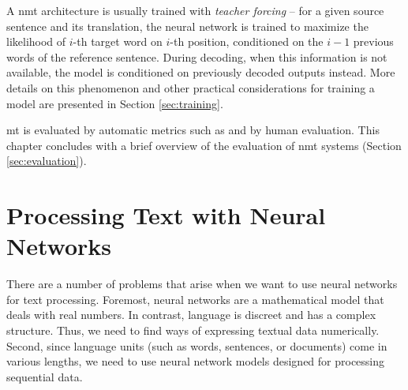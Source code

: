 A \gls{nmt} architecture is usually trained with \emph{teacher forcing} -- for
a given source sentence and its translation, the neural network is trained to
maximize the likelihood of $i$-th target word on $i$-th position, conditioned
on the $i-1$ previous words of the reference sentence. During decoding, when
this information is not available, the model is conditioned on previously
decoded outputs instead. More details on this phenomenon and other practical
considerations for training a model are presented in Section
\ref{sec:training}. 






\Gls{mt} is evaluated by automatic metrics such as  and by
human evaluation. This chapter concludes with a brief overview of the
evaluation of \gls{nmt} systems (Section \ref{sec:evaluation}).





\section{Processing Text with Neural Networks}
\label{sec:text-processing}

There are a number of problems that arise when we want to use neural networks
for text processing. Foremost, neural networks are a mathematical model that
deals with real numbers. In contrast, language is discreet and has a complex
structure. Thus, we need to find ways of expressing textual data
numerically. Second, since language units (such as words, sentences, or
documents) come in various lengths, we need to use neural network models
designed for processing sequential data.

